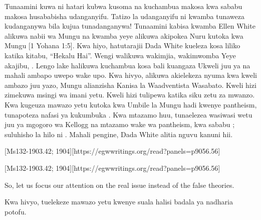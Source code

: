 Tunaamini kuwa ni hatari kubwa kusoma na kuchambua makosa kwa sababu makosa husababisha udanganyifu. Tatizo la udanganyifu ni kwamba tunaweza kudanganywa bila kujua tunadanganywa! Tunaamini kabisa kwamba Ellen White alikuwa nabii wa Mungu na kwamba yeye alikuwa akipokea Nuru kutoka kwa Mungu [1 Yohana 1:5]. Kwa hiyo, hatutarajii Dada White kueleza kosa liliko katika kitabu, “Hekalu Hai”. Wengi walikuwa wakimjia, wakimwomba  Yeye akajibu, . Lengo lake halikuwa kuchambua kosa bali kuangaza Ukweli juu ya  na mahali ambapo uwepo wake upo. Kwa hivyo, alikuwa akielekeza nyuma kwa kweli ambazo juu yazo, Mungu alianzisha Kanisa la Waadventista Wasabato. Kweli hizi zimekuwa msingi wa imani yetu. Kweli hizi tulipewa katika siku zetu za mwanzo. Kwa kugeuza mawazo yetu kutoka kwa Umbile la Mungu hadi kwenye pantheism, tunapoteza nafasi ya kukumbuka . Kwa mtazamo huu, tunaelezea wasiwasi wetu juu ya mgogoro wa Kellogg na mtazamo wake wa pantheism, kwa sababu ; suluhisho la hilo ni . Mahali pengine, Dada White alitia nguvu kanuni hii.


[Ms132-1903.42; 1904][https://egwwritings.org/read?panels=p9056.56]


[Ms132-1903.42; 1904][https://egwwritings.org/read?panels=p9056.56]


So, let us focus our attention on the real issue instead of the false theories.


Kwa hivyo, tuelekeze mawazo yetu kwenye suala halisi badala ya nadharia potofu.






